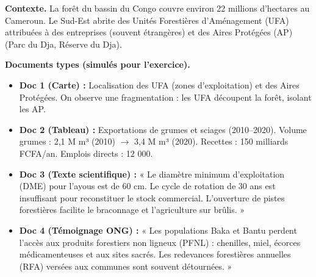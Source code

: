 \documentclass[11pt]{article}
\newcommand{\cle}[1]{{\popxbold\color{popdark}#1}}
\begin{document}
\begin{experience}
\textbf{Contexte.} La forêt du bassin du Congo couvre environ 22 millions d'hectares au Cameroun. Le Sud-Est abrite des \cle{Unités Forestières d'Aménagement (UFA)} attribuées à des entreprises (souvent étrangères) et des \cle{Aires Protégées (AP)} (Parc du Dja, Réserve du Dja). 

\textbf{Documents types (simulés pour l'exercice).}
\begin{itemize}
    \item \textbf{Doc 1 (Carte) :} Localisation des UFA (zones d'exploitation) et des Aires Protégées. On observe une \cle{fragmentation} : les UFA découpent la forêt, isolant les AP.
    \item \textbf{Doc 2 (Tableau) :} Exportations de grumes et sciages (2010–2020). Volume grumes : 2,1 M m³ (2010) $\rightarrow$ 3,4 M m³ (2020). Recettes : 150 milliards FCFA/an. Emplois directs : 12 000.
    \item \textbf{Doc 3 (Texte scientifique) :} « Le \cle{diamètre minimum d'exploitation (DME)} pour l'\cle{ayous} est de 60 cm. Le \cle{cycle de rotation} de 30 ans est insuffisant pour reconstituer le \cle{stock commercial}. L'ouverture de pistes forestières facilite le \cle{braconnage} et l'agriculture sur brûlis. »
    \item \textbf{Doc 4 (Témoignage ONG) :} « Les populations \cle{Baka} et \cle{Bantu} perdent l'accès aux \cle{produits forestiers non ligneux (PFNL)} : chenilles, miel, écorces médicamenteuses et aux sites sacrés. Les \cle{redevances forestières annuelles (RFA)} versées aux communes sont souvent détournées. »
\end{itemize}


\end{experience}
\end{document}
